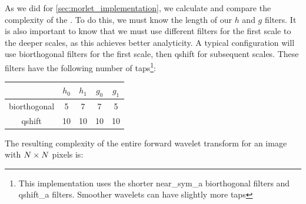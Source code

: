   As we did for \autoref{sec:morlet_implementation}, we calculate and compare
  the complexity of the \DTCWT\@. To do this, we must know the length of our
  $h$ and $g$ filters. It is also important to know that we must use different
  filters for the first scale to the deeper scales, as this achieves better
  analyticity. A typical configuration will use biorthogonal filters for the
  first scale, then qshift for subsequent scales.
  These filters have the following number of taps\footnote{This implementation
  uses the shorter near\_sym\_a biorthogonal filters and qshift\_a filters.
  Smoother wavelets can have slightly more taps}:
    \begin{center}
    \begin{tabular}{ccccc} \hline
                   & $h_0$ & $h_1$ & $g_0$ & $g_1$ \\\hline
      biorthogonal & 5     & 7     & 7     & 5     \\
      qshift       & 10    & 10    & 10    & 10      
    \end{tabular}
    \end{center}
  The resulting complexity of the entire forward wavelet transform for an image
  with $N\times N$ pixels is:
